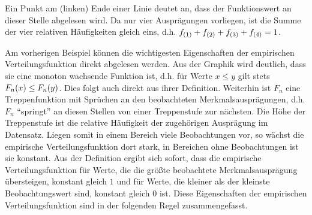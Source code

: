 \documentclass{lecture}
\begin{document}
\begin{example}
\begin{center}
        \end{center}
        Ein Punkt am (linken) Ende einer Linie deutet an, dass der Funktionswert an dieser Stelle abgelesen wird.
        Da nur vier Ausprägungen vorliegen, ist die Summe der vier relativen Häufigkeiten gleich eins, d.h. \(f_{\parentheses*{1}} + f_{\parentheses*{2}} + f_{\parentheses*{3}} + f_{\parentheses*{4}} = 1\).
    \end{example}

    Am vorherigen Beispiel können die wichtigesten Eigenschaften der empirischen Verteilungsfunktion direkt abgelesen werden.
    Aus der Graphik wird deutlich, dass sie eine monoton wachsende Funktion ist, d.h. für Werte \(x \le y\) gilt stets \(F_n\parentheses*{x} \le F_n\parentheses*{y}\).
    Dies folgt auch direkt aus ihrer Definition.
    Weiterhin ist \(F_n\) eine Treppenfunktion mit Sprüchen an den beobachteten Merkmalsausprägungen, d.h. \(F_n\) ``springt'' an diesen Stellen von einer Treppenstufe zur nächsten.
    Die Höhe der Treppenstufe ist die relative Häufigkeit der zugehörigen Ausprägung im Datensatz.
    Liegen somit in einem Bereich viele Beobachtungen vor, so wächst die empirische Verteilungsfunktion dort stark, in Bereichen ohne Beobachtungen ist sie konstant.
    Aus der Definition ergibt sich sofort, dass die empirische Verteilungsfunktion für Werte, die die größte beobachtete Merkmalsausprägung übersteigen, konstant gleich \(1\) und für Werte, die kleiner als der kleinste Beobachtungswert sind, konstant gleich \(0\) ist.
    Diese Eigenschaften der empirischen Verteilungsfunktion sind in der folgenden Regel zusammengefasst.
\end{document}
